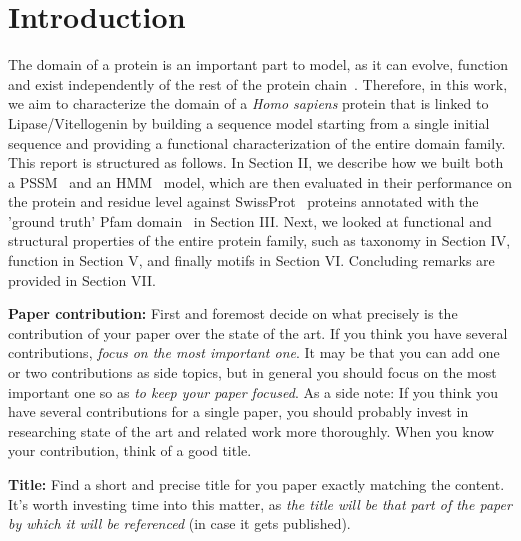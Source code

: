 
\section{Introduction}
\label{sec:introduction}

The domain of a protein is an important part to model, as it can evolve, function and exist independently of the rest of the protein chain~\cite{domain_structure}. Therefore, in this work, we aim to characterize the domain of a \textit{Homo sapiens} protein that is linked to Lipase/Vitellogenin by building a sequence model starting from a single initial sequence and providing a functional characterization of the entire domain family. This report is structured as follows. In Section II, we describe how we built both a PSSM~\cite{psiblast} and an HMM~\cite{hmmer} model, which are then evaluated in their performance on the protein and residue level against SwissProt~\cite{swissprot} proteins annotated with the 'ground truth' Pfam domain~\cite{pfam} in Section III. Next, we looked at functional and structural properties of the entire protein family, such as taxonomy in Section IV, function in Section V, and finally motifs in Section VI. Concluding remarks are provided in Section VII.


















\iffalse
\begin{remark}
\textbf{Paper contribution:} First and foremost decide on what precisely is the contribution of your paper over the state of the art. If you think you have several contributions, {\it focus on the most important one}. It may be that you can add one or two contributions as side topics, but in general you should focus on the most important one so as {\it to keep your paper focused}. As a side note: If you think you have several contributions for a single paper, you should probably invest in researching state of the art and related work more thoroughly. When you know your contribution, think of a good title.
\end{remark}

\begin{remark} 
\textbf{Title:} Find a short and precise title for you paper exactly matching the content. It's worth investing time into this matter, as {\it the title will be that part of the paper by which it will be referenced} (in case it gets published).
\end{remark}


